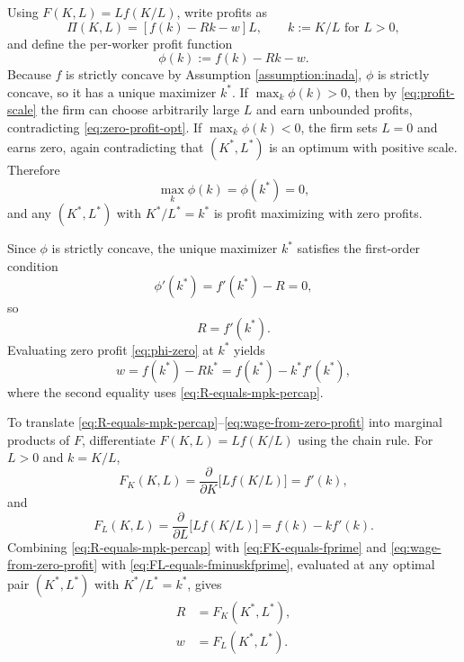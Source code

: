\documentclass[\topdir/lecture\_notes.tex]{subfiles}
\begin{document}
Using $F(K,L)=L f(K/L)$, write profits as
\begin{equation}
  \Pi(K,L)=[f(k)-Rk-w]L,\qquad k:=K/L \text{ for } L>0,
  \label{eq:profit-scale}
\end{equation}
and define the per-worker profit function
\begin{equation*}
  \phi(k):=f(k)-Rk-w.
\end{equation*}
Because $f$ is strictly concave by Assumption \ref{assumption:inada}, $\phi$ is strictly concave, so it has a unique maximizer $k^{*}$.
If $\max_{k}\phi(k)>0$, then by \eqref{eq:profit-scale} the firm can choose arbitrarily large $L$ and earn unbounded profits, contradicting \eqref{eq:zero-profit-opt}.
If $\max_{k}\phi(k)<0$, the firm sets $L=0$ and earns zero, again contradicting that $(K^{*},L^{*})$ is an optimum with positive scale.
Therefore
\begin{equation}
  \max_{k}\phi(k)=\phi(k^{*})=0,
  \label{eq:phi-zero}
\end{equation}
and any $(K^{*},L^{*})$ with $K^{*}/L^{*}=k^{*}$ is profit maximizing with zero profits.

Since $\phi$ is strictly concave, the unique maximizer $k^{*}$ satisfies the first-order condition
\begin{equation*}
  \phi'(k^{*})=f'(k^{*})-R=0,
\end{equation*}
so
\begin{equation}
  R=f'(k^{*}).
  \label{eq:R-equals-mpk-percap}
\end{equation}
Evaluating zero profit \eqref{eq:phi-zero} at $k^{*}$ yields
\begin{equation}
  w=f(k^{*})-Rk^{*}=f(k^{*})-k^{*} f'(k^{*}),
  \label{eq:wage-from-zero-profit}
\end{equation}
where the second equality uses \eqref{eq:R-equals-mpk-percap}.

To translate \eqref{eq:R-equals-mpk-percap}--\eqref{eq:wage-from-zero-profit} into marginal products of $F$, differentiate $F(K,L)=L f(K/L)$ using the chain rule. For $L>0$ and $k=K/L$,
\begin{equation}
  F_{K}(K,L)=\frac{\partial}{\partial K}\big[L f(K/L)\big]=f'(k),
  \label{eq:FK-equals-fprime}
\end{equation}
and
\begin{equation}
  F_{L}(K,L)=\frac{\partial}{\partial L}\big[L f(K/L)\big]=f(k)-k f'(k).
  \label{eq:FL-equals-fminuskfprime}
\end{equation}
Combining \eqref{eq:R-equals-mpk-percap} with \eqref{eq:FK-equals-fprime} and \eqref{eq:wage-from-zero-profit} with \eqref{eq:FL-equals-fminuskfprime}, evaluated at any optimal pair $(K^{*},L^{*})$ with $K^{*}/L^{*}=k^{*}$, gives
\begin{align}
  R & =F_{K}(K^{*},L^{*}),\label{eq:rental-rate} \\
  w & =F_{L}(K^{*},L^{*}).\label{eq:wage-rate}
\end{align}
\end{document}
